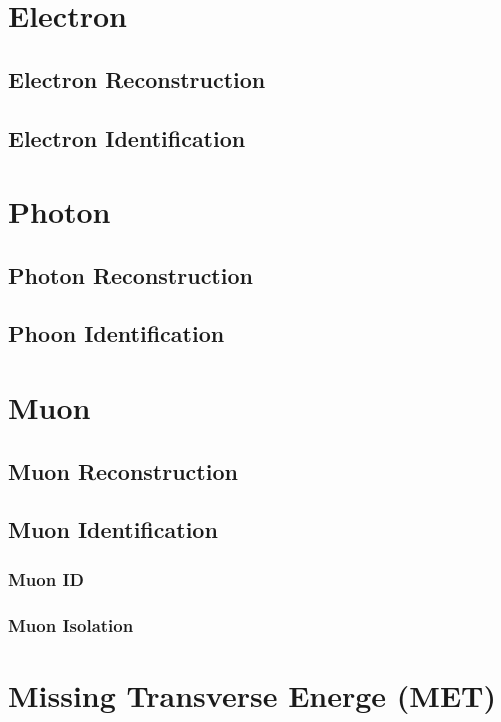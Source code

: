 \section{Electron}
\subsection{Electron Reconstruction}
\subsection{Electron Identification}
\section{Photon}
\subsection{Photon Reconstruction}
\subsection{Phoon Identification}
\section{Muon}
\subsection{Muon Reconstruction}
\subsection{Muon Identification}
\subsubsection{Muon ID}
\subsubsection{Muon Isolation}
\section{Missing Transverse Energe (MET)}
